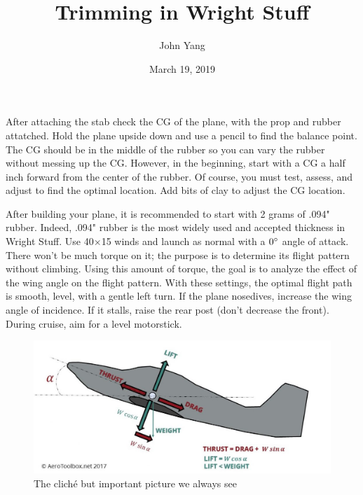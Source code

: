 \documentclass[twocolumn]{article}
\title{Trimming in Wright Stuff}
\author{John Yang}
\date{March 19, 2019}
\begin{document}

After attaching the stab check the CG of the plane, with the prop and rubber attatched. Hold the plane upside down and use a pencil to find the balance point. The CG should be in the middle of the rubber so you can vary the rubber without messing up the CG. However, in the beginning, start with a CG a half inch forward from the center of the rubber. Of course, you must test, assess, and adjust to find the optimal location. Add bits of clay to adjust the CG location. 

After building your plane, it is recommended to start with 2 grams of .094" rubber. Indeed, .094" rubber is the most widely used and accepted thickness in Wright Stuff. Use 40$\times$15 winds and launch as normal with a $0\degree$ angle of attack. There won't be much torque on it; the purpose is to determine its flight pattern without climbing. Using this amount of torque, the goal is to analyze the effect of the wing angle on the flight pattern. With these settings, the optimal flight path is smooth, level, with a gentle left turn. If the plane nosedives, increase the wing angle of incidence. If it stalls, raise the rear post (don't decrease the front). During cruise, aim for a level motorstick. 

\begin{figure}[h]
\caption{The clich\'e but important picture we always see}
\centering
\includegraphics[scale=0.23]{forces}
\end{figure}
 
\end{document}
